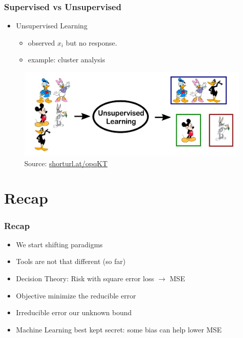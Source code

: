\documentclass[
  shownotes,
  xcolor={svgnames},
  hyperref={colorlinks,citecolor=DarkBlue,linkcolor=DarkRed,urlcolor=DarkBlue}
  ]{beamer}
\begin{document}
\begin{frame}
\frametitle{Supervised vs Unsupervised}

\begin{itemize}
  \item Unsupervised Learning 
  \begin{itemize}
    \item observed $x_i$ but no response. 
    \item example: cluster analysis
  \end{itemize}
  \end{itemize}

\bigskip
    \begin{figure}[H] \centering
  
    \centering
    \includegraphics[scale=0.2]{figures/unsupevised}
  \\
  \tiny
  Source: \url{shorturl.at/opqKT}
\end{figure}


\end{frame}
\section{Recap}
\begin{frame}
\frametitle{Recap}

\begin{itemize} 
    \item We start shifting paradigms
    \medskip
    \item Tools are not that different (so far)
    \medskip
    \item Decision Theory: Risk with square error loss $\rightarrow$ MSE
    \medskip
    \item Objective minimize the reducible error
    \medskip
    \item Irreducible error our unknown bound
    \medskip
    \item Machine Learning best kept secret:  some bias can help lower MSE
\end{itemize}
\end{frame}
\end{document}
